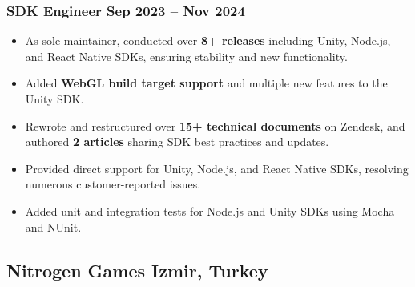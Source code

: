 \documentclass[11pt]{article}
\newcommand{\rside}[1]{
              \hfill {\normalfont\color{accent} #1}%
          }
\begin{document}
                                                                                      \subsubsection{SDK Engineer \rside{Sep 2023 -- Nov 2024}}
                                                                                      \begin{itemize}
                                                                                                \item As sole maintainer, conducted over \textbf{8+ releases} including Unity, Node.js, and React Native SDKs, ensuring stability and new functionality.
                                                                                                      \item Added \textbf{WebGL build target support} and multiple new features to the Unity SDK.
                                                                                                            \item Rewrote and restructured over \textbf{15+ technical documents} on Zendesk, and authored \textbf{2 articles} sharing SDK best practices and updates.
                                                                                                                  \item Provided direct support for Unity, Node.js, and React Native SDKs, resolving numerous customer-reported issues.
                                                                                                                        \item Added unit and integration tests for Node.js and Unity SDKs using Mocha and NUnit.
                                                                                      \end{itemize}

                                                                                      \subsection{Nitrogen Games \rside{Izmir, Turkey}}
\end{document}

